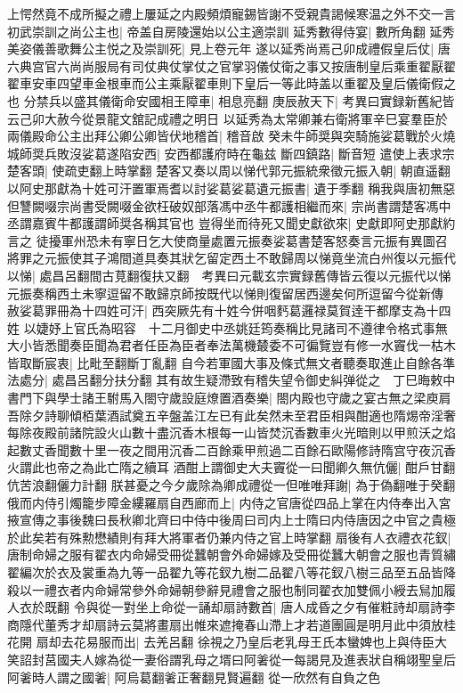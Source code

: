 上愕然竟不成所擬之禮上屢延之内殿頻煩寵錫皆謝不受親貴謁候寒温之外不交一言初武崇訓之尚公主也|{
	帝盖自房陵還始以公主適崇訓}
延秀數得侍宴|{
	數所角翻}
延秀美姿儀善歌舞公主悦之及崇訓死|{
	見上卷元年}
遂以延秀尚焉己卯成禮假皇后仗|{
	唐六典宫官六尚尚服局有司仗典仗掌仗之官掌羽儀仗衛之事又按唐制皇后乘重翟厭翟翟車安車四望車金根車而公主乘厭翟車則下皇后一等此時盖以重翟及皇后儀衛假之也}
分禁兵以盛其儀衛命安國相王障車|{
	相息亮翻}
庚辰赦天下|{
	考異曰實録新舊紀皆云己卯大赦今從景龍文舘記成禮之明日}
以延秀為太常卿兼右衛將軍辛巳宴羣臣於兩儀殿命公主出拜公卿公卿皆伏地稽首|{
	稽音啟}
癸未牛師奨與突騎施娑葛戰於火燒城師奨兵敗沒娑葛遂陷安西|{
	安西都護府時在龜兹}
斷四鎮路|{
	斷音短}
遣使上表求宗楚客頭|{
	使疏吏翻上時掌翻}
楚客又奏以周以悌代郭元振統衆徵元振入朝|{
	朝直遥翻}
以阿史那獻為十姓可汗置軍焉耆以討娑葛娑葛遺元振書|{
	遺于季翻}
稱我與唐初無惡但讐闕啜宗尚書受闕啜金欲枉破奴部落馮中丞牛都護相繼而來|{
	宗尚書謂楚客馮中丞謂嘉賓牛都護謂師奨各稱其官也}
豈得坐而待死又聞史獻欲來|{
	史獻即阿史那獻約言之}
徒擾軍州恐未有寧日乞大使商量處置元振奏娑葛書楚客怒奏言元振有異圖召將罪之元振使其子鴻間道具奏其狀乞留定西土不敢歸周以悌竟坐流白州復以元振代以悌|{
	處昌呂翻間古莧翻復扶又翻　考異曰元載玄宗實録舊傳皆云復以元振代以悌元振奏稱西土未寧逗留不敢歸京師按既代以悌則復留居西邊矣何所逗留今從新傳}
赦娑葛罪冊為十四姓可汗|{
	西突厥先有十姓今併咽麫葛邏禄莫賀逹干都摩支為十四姓}
以婕妤上官氏為昭容　十二月御史中丞姚廷筠奏稱比見諸司不遵律令格式事無大小皆悉聞奏臣聞為君者任臣為臣者奉法萬機樷委不可徧覽豈有修一水竇伐一枯木皆取斷宸衷|{
	比毗至翻斷丁亂翻}
自今若軍國大事及條式無文者聽奏取進止自餘各準法處分|{
	處昌呂翻分扶分翻}
其有故生疑滯致有稽失望令御史糾弹從之　丁巳晦敕中書門下與學士諸王駙馬入閤守歲設庭燎置酒奏樂|{
	閤内殿也守歲之宴古無之梁庾肩吾除夕詩聊傾栢葉酒試奠五辛盤盖江左已有此矣然未至君臣相與酣適也隋焬帝淫奢每除夜殿前諸院設火山數十盡沉香木根每一山皆焚沉香數車火光暗則以甲煎沃之焰起數丈香聞數十里一夜之間用沉香二百餘乘甲煎過二百餘石歐陽修詩隋宫守夜沉香火謂此也帝之為此亡隋之續耳}
酒酣上謂御史大夫竇從一曰聞卿久無伉儷|{
	酣戶甘翻伉苦浪翻儷力計翻}
朕甚憂之今夕歲除為卿成禮從一但唯唯拜謝|{
	為于偽翻唯于癸翻}
俄而内侍引燭籠步障金縷羅扇自西廊而上|{
	内侍之官唐從四品上掌在内侍奉出入宮掖宣傳之事後魏曰長秋卿北齊曰中侍中後周曰司内上士隋曰内侍唐因之中官之貴極於此矣若有殊勲懋績則有拜大將軍者仍兼内侍之官上時掌翻}
扇後有人衣禮衣花釵|{
	唐制命婦之服有翟衣内命婦受冊從蠶朝會外命婦嫁及受冊從蠶大朝會之服也青質繡翟編次於衣及裳重為九等一品翟九等花釵九樹二品翟八等花釵八樹三品至五品皆降殺以一禮衣者内命婦常參外命婦朝參辭見禮會之服也制同翟衣加雙佩小綬去舃加履人衣於既翻}
令與從一對坐上命從一誦却扇詩數首|{
	唐人成昏之夕有催粧詩却扇詩李商隱代董秀才却扇詩云莫將畫扇出帷來遮掩春山滯上才若道團圓是明月此中須放桂花開}
扇却去花易服而出|{
	去羌呂翻}
徐視之乃皇后老乳母王氏本蠻婢也上與侍臣大笑詔封莒國夫人嫁為從一妻俗謂乳母之壻曰阿㸙從一每謁見及進表狀自稱翊聖皇后阿㸙時人謂之國㸙|{
	阿烏葛翻㸙正奢翻見賢遍翻}
從一欣然有自負之色

